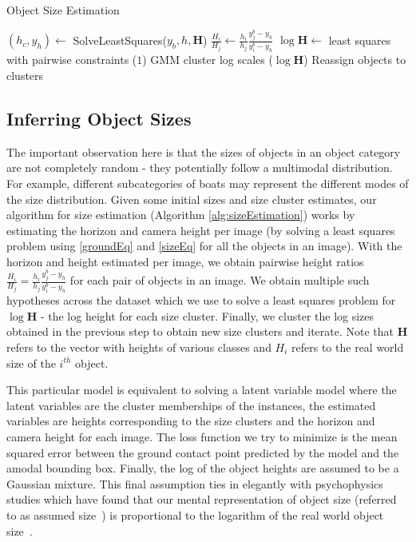 \begin{algorithm}[h]
\caption{Object Size Estimation}
\begin{algorithmic}
\State $(h_c,y_h) \gets $ SolveLeastSquares($y_b,h,\mathbf{H}$)
\State $\frac{H_i}{H_j} \gets \frac{h_i}{h_j}\frac{y_j^b-y_h}{y_i^b-y_h}$
\EndFor
\EndFor
\State $\log \mathbf{H} \gets$ least squares with pairwise constraints ($1$)
\State GMM cluster log scales ($\log \mathbf{H}$)
\State Reassign objects to clusters
\EndWhile
\end{algorithmic}
\label{alg:sizeEstimation}
\end{algorithm}

\subsection{Inferring Object Sizes} 
The important observation here is that the sizes of objects in an object category are not completely random - they potentially follow a multimodal distribution. For example, different subcategories of boats may represent the different modes of the size distribution. Given some initial sizes and size cluster estimates, our algorithm for size estimation (Algorithm \ref{alg:sizeEstimation}) works by estimating the horizon and camera height per image (by solving a least squares problem using \eqref{groundEq} and \eqref{sizeEq} for all the objects in an image). With the horizon and height estimated per image, we obtain pairwise height ratios $\frac{H_i}{H_j} = \frac{h_i}{h_j}\frac{y_j^b-y_h}{y_i^b-y_h}$ for each pair of objects in an image. We obtain multiple such hypotheses across the dataset which we use to solve a least squares problem for $\log \mathbf{H}$ - the log height for each size cluster. Finally, we cluster the log sizes obtained in the previous step to obtain new size clusters and iterate. Note that $\mathbf{H}$ refers to the vector with heights of various classes and $H_i$ refers to the real world size of the $i^{th}$ object.

This particular model is equivalent to solving a latent variable model where the latent variables are the cluster memberships of the instances, the estimated variables are heights corresponding to the size clusters and the horizon and camera height for each image. The loss function we try to minimize is the mean squared error between the ground contact point predicted by the model and the amodal bounding box. Finally, the log of the object heights are assumed to be a Gaussian mixture. This final assumption ties in elegantly with psychophysics studies which have found that our mental representation of object size (referred to as assumed size~\cite{ittelson1951size,baird1963retinal,epstein1963influence}) is proportional to the logarithm of the real world object size~\cite{konkle2011canonical}.

